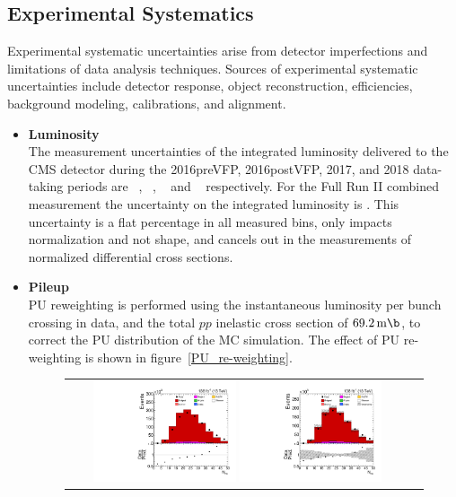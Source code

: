 \subsection{Experimental Systematics}
\label{Experimental_Systematics}
Experimental systematic uncertainties arise from detector imperfections and limitations of data analysis techniques.
Sources of experimental systematic uncertainties include detector response, object reconstruction, efficiencies, background modeling, calibrations, and alignment.
\begin{itemize}
    \item {\bf Luminosity} \\
    The measurement uncertainties of the integrated luminosity delivered to the CMS detector during the 2016preVFP, 2016postVFP, 2017, and 2018 data-taking periods are \lumierrSixPreVFP~\cite{bib:lumipas16}, \lumierrSixPostVFP~\cite{bib:lumipas16}, \lumierrSeven~\cite{bib:lumipas17} and \lumierrEight~\cite{bib:lumipas18} respectively. 
    For the Full Run II combined measurement the uncertainty on the integrated luminosity is \lumierrRuniiUL.
    This uncertainty is a flat percentage in all measured bins, only impacts normalization and not shape, and cancels out in the measurements of normalized differential cross sections.
    \item {\bf Pileup} \\
    PU reweighting is performed using the instantaneous luminosity per bunch crossing in data, and the total $pp$ inelastic cross section of $\SI{69.2}{\m \b}$, to correct the PU distribution of the MC simulation.
    The effect of PU re-weighting is shown in figure~\ref{PU_re-weighting}.
    \begin{figure}[htb]
    \begin{center}
        \begin{tabular}{cc}
            \includegraphics[width=0.425\textwidth]{fig_fullRun2UL/controlplots/combined/vertMulti_noPU_step8.pdf}
            \includegraphics[width=0.425\textwidth]{fig_fullRun2UL/controlplots/combined/vertMulti_step8.pdf}

\end{tabular}
\end{center}
\end{figure}
\end{itemize}
